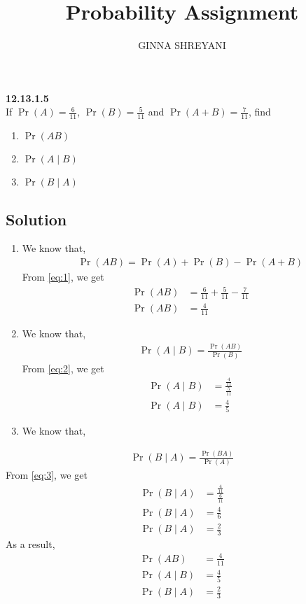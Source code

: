 \documentclass[10pt,twocolumn]{article}
\title{
Probability Assignment
}
\author{GINNA SHREYANI}
\date{}
\providecommand{\pr}[1]{\ensuremath{\Pr\left(#1\right)}}
\begin{document}
\maketitle


\textbf{12.13.1.5}\\
If $\pr{A}=\frac{6}{11}$, $\pr{B}=\frac{5}{11}$ and $\pr{A+B}=\frac{7}{11}$, find
\begin{enumerate}
	\item $\pr{AB}$   
	\item $\pr{A \mid B}$
	\item $\pr{B \mid A}$
\end{enumerate}
\subsection*{Solution}
\begin{enumerate}
	\item We know that,
\begin{align}
	\pr{AB} = \pr{A} + \pr{B} -\pr{A+B}
	\label{eq:1}
\end{align}
From \eqref{eq:1}, we get
\begin{align}
	\pr{AB} &= \frac{6}{11} + \frac{5}{11} - \frac{7}{11}\\
	\pr{AB} &= \frac{4}{11}
\end{align}
	\item We know that,
\begin{align}
	\pr{A \mid B} = \frac{\pr{AB}}{\pr{B}}
	\label{eq:2}
\end{align}
From \eqref{eq:2}, we get
\begin{align}
	\pr{A \mid B} &= \frac{\frac{4}{11}}{\frac{5}{11}}\\
	\pr{A \mid B} &= \frac{4}{5}
\end{align}
	\item We know that,
\end{enumerate}
\begin{align}
	\pr{B \mid A}=\frac{\pr{BA}}{\pr{A}}
	\label{eq:3}
\end{align}
From \eqref{eq:3}, we get
\begin{align}
	\pr{B \mid A} &= \frac{\frac{4}{11}}{\frac{6}{11}}\\
	\pr{B \mid A} &= \frac{4}{6}\\
	\pr{B \mid A} &= \frac{2}{3}
\end{align}
As a result,
\begin{align}
	\pr{AB} &= \frac{4}{11}\\
	\pr{A \mid B} &= \frac{4}{5}\\
	\pr{B \mid A} &= \frac{2}{3}
\end{align}
\end{document}
